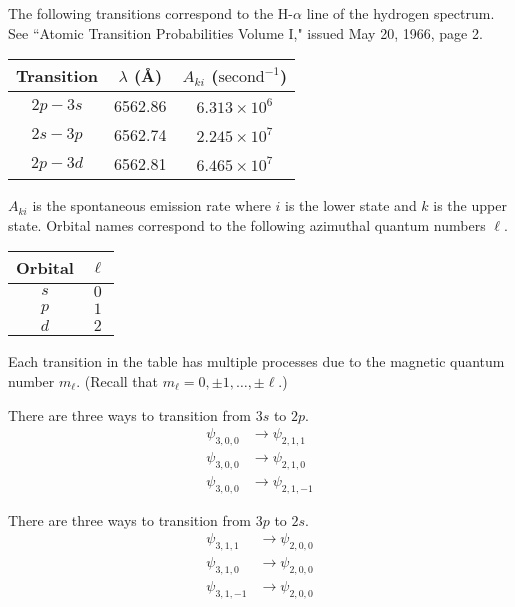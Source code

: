 \documentclass[12pt]{article}
\begin{document}
The following transitions correspond to the H-$\alpha$ line of the hydrogen spectrum.
See ``Atomic Transition Probabilities Volume I," issued May 20, 1966, page 2.

\begin{center}
\begin{tabular}{|c|c|c|}
\hline
Transition & $\lambda$ (\AA) & $A_{ki}$ ($\text{second}^{-1}$)
\\
\hline
$2p-3s$ & 6562.86 & $6.313\times10^6$
\\
$2s-3p$ & 6562.74 & $2.245\times10^7$
\\
$2p-3d$ & 6562.81 & $6.465\times10^7$
\\
\hline
\end{tabular}
\end{center}

$A_{ki}$ is the spontaneous emission rate where $i$ is the lower state and $k$ is the upper state.
Orbital names correspond to the following azimuthal quantum numbers $\ell$.
\begin{center}
\begin{tabular}{|c|c|}
\hline
Orbital & $\ell$
\\
\hline
$s$ & $0$
\\
$p$ & $1$
\\
$d$ & $2$
\\
\hline
\end{tabular}
\end{center}

Each transition in the table has multiple processes due to the magnetic quantum number $m_\ell$.
(Recall that $m_\ell=0,\pm1,\ldots,\pm\ell$.)

\bigskip
There are three ways to transition from $3s$ to $2p$.
\begin{align*}
\psi_{3,0,0}&\rightarrow\psi_{2,1,1}
\\
\psi_{3,0,0}&\rightarrow\psi_{2,1,0}
\\
\psi_{3,0,0}&\rightarrow\psi_{2,1,-1}
\end{align*}

There are three ways to transition from $3p$ to $2s$.
\begin{align*}
\psi_{3,1,1}&\rightarrow\psi_{2,0,0}
\\
\psi_{3,1,0}&\rightarrow\psi_{2,0,0}
\\
\psi_{3,1,-1}&\rightarrow\psi_{2,0,0}
\end{align*}
\end{document}
